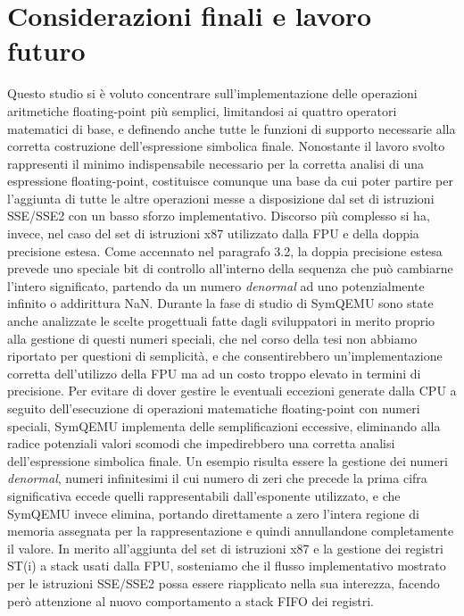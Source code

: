\documentclass[Lau, oneside]{sapthesis}%
\begin{document}
\section{Considerazioni finali e lavoro futuro}
Questo studio si è voluto concentrare sull'implementazione delle operazioni aritmetiche floating-point più semplici, limitandosi ai quattro operatori matematici di base, e definendo anche tutte le funzioni di supporto necessarie alla corretta costruzione dell'espressione simbolica finale.
\newline
Nonostante il lavoro svolto rappresenti il minimo indispensabile necessario per la corretta analisi di una espressione floating-point, costituisce comunque una base da cui poter partire per l'aggiunta di tutte le altre operazioni messe a disposizione dal set di istruzioni SSE/SSE2 con un basso sforzo implementativo.
\newline \newline
Discorso più complesso si ha, invece, nel caso del set di istruzioni x87 utilizzato dalla FPU e della doppia precisione estesa.
\newline \newline
Come accennato nel paragrafo 3.2, la doppia precisione estesa prevede uno speciale bit di controllo all'interno della sequenza che può cambiarne l'intero significato, partendo da un numero \textit{denormal} ad uno potenzialmente infinito o addirittura NaN.
\newline
Durante la fase di studio di SymQEMU sono state anche analizzate le scelte progettuali fatte dagli sviluppatori in merito proprio alla gestione di questi numeri speciali, che nel corso della tesi non abbiamo riportato per questioni di semplicità, e che consentirebbero un'implementazione corretta dell'utilizzo della FPU ma ad un costo troppo elevato in termini di precisione.
\newline
Per evitare di dover gestire le eventuali eccezioni generate dalla CPU a seguito dell'esecuzione di operazioni matematiche floating-point con numeri speciali, SymQEMU implementa delle semplificazioni eccessive, eliminando alla radice potenziali valori scomodi che impedirebbero una corretta analisi dell'espressione simbolica finale.
\newline
Un esempio risulta essere la gestione dei numeri \textit{denormal}, numeri infinitesimi il cui numero di zeri che precede la prima cifra significativa eccede quelli rappresentabili dall'esponente utilizzato, e che SymQEMU invece elimina, portando direttamente a zero l'intera regione di memoria assegnata per la rappresentazione e quindi annullandone completamente il valore.
\newline \newline
In merito all'aggiunta del set di istruzioni x87 e la gestione dei registri ST(i) a stack usati dalla FPU, sosteniamo che il flusso implementativo mostrato per le istruzioni SSE/SSE2 possa essere riapplicato nella sua interezza, facendo però attenzione al nuovo comportamento a stack FIFO dei registri.
\end{document}
